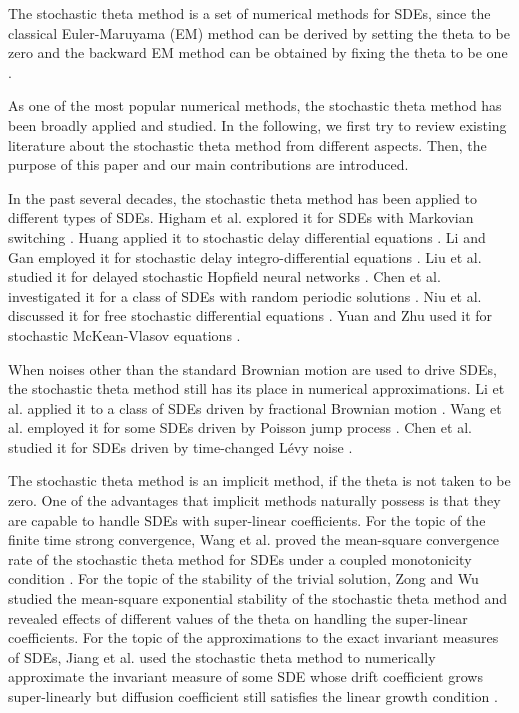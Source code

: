 \documentclass{article}
\begin{document}
\par
The stochastic theta method is a set of numerical methods for SDEs, since the classical Euler-Maruyama (EM) method can be derived by setting the theta to be zero and the backward EM method can be obtained by fixing the theta to be one \cite{Higham2000}.
\par
As one of the most popular numerical methods, the stochastic theta method has been broadly applied and studied. In the following, we first try to review existing literature about the stochastic theta method from different aspects. Then, the purpose of this paper and our main contributions are introduced.
\par
In the past several decades, the stochastic theta method has been applied to different types of SDEs. Higham et al. explored it for SDEs with Markovian switching \cite{HighamMaoYuan2007}. Huang applied it to stochastic delay differential equations \cite{Huang2014}. Li and Gan employed it for stochastic delay integro-differential equations \cite{LiGan2012}. Liu et al. studied it for delayed stochastic Hopfield neural networks \cite{LiuDengZhu2018}. Chen et al. investigated it for a class of SDEs with random periodic solutions \cite{ChenCaoChen2025}. Niu et al. discussed it for free stochastic differential equations \cite{NiuWeiYinZeng2025}. Yuan and Zhu used it for stochastic McKean-Vlasov equations \cite{YuanZhu2026}.
\par
When noises other than the standard Brownian motion are used to drive SDEs, the stochastic theta method still has its place in numerical approximations. Li et al. applied it to a class of SDEs driven by fractional Brownian motion \cite{LiHuHuangWang2023}. Wang et al. employed it for some SDEs driven by Poisson jump process \cite{WangChenNiuNiu2023}. Chen et al. studied it for SDEs driven by time-changed L\'evy noise \cite{ChenLiuWu2026}.
\par
The stochastic theta method is an implicit method, if the theta is not taken to be zero. One of the advantages that implicit methods naturally possess is that they are capable to handle SDEs with super-linear coefficients. For the topic of the finite time strong convergence, Wang et al. proved the mean-square convergence rate of the stochastic theta method for SDEs under a coupled monotonicity condition \cite{WangWuDong2020}. For the topic of the stability of the trivial solution, Zong and Wu studied the mean-square exponential stability of the stochastic theta method and revealed effects of different values of the theta on handling the super-linear coefficients. For the topic of the approximations to the exact invariant measures of SDEs, Jiang et al. used the stochastic theta method to numerically approximate the invariant measure of some SDE whose drift coefficient grows super-linearly but diffusion coefficient still satisfies the linear growth condition \cite{JiangWengLiu2020}.
\end{document}
